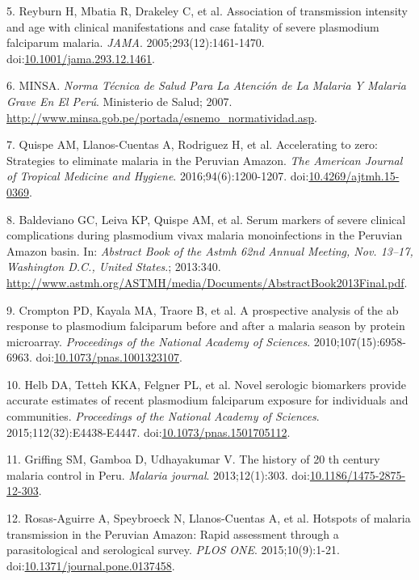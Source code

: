 \documentclass[]{article}
\begin{document}
\hypertarget{ref-reyburn2015}{}
5. Reyburn H, Mbatia R, Drakeley C, et al. Association of transmission
intensity and age with clinical manifestations and case fatality of
severe plasmodium falciparum malaria. \emph{JAMA}.
2005;293(12):1461-1470.
doi:\href{https://doi.org/10.1001/jama.293.12.1461}{10.1001/jama.293.12.1461}.

\hypertarget{ref-norma2001}{}
6. MINSA. \emph{Norma Técnica de Salud Para La Atención de La Malaria Y
Malaria Grave En El Perú}. Ministerio de Salud; 2007.
\url{http://www.minsa.gob.pe/portada/esnemo_normatividad.asp}.

\hypertarget{ref-accelerate2016}{}
7. Quispe AM, Llanos-Cuentas A, Rodriguez H, et al. Accelerating to
zero: Strategies to eliminate malaria in the Peruvian Amazon. \emph{The
American Journal of Tropical Medicine and Hygiene}.
2016;94(6):1200-1207.
doi:\href{https://doi.org/10.4269/ajtmh.15-0369}{10.4269/ajtmh.15-0369}.

\hypertarget{ref-baldevi2013}{}
8. Baldeviano GC, Leiva KP, Quispe AM, et al. Serum markers of severe
clinical complications during plasmodium vivax malaria monoinfections in
the Peruvian Amazon basin. In: \emph{Abstract Book of the Astmh 62nd
Annual Meeting, Nov. 13--17, Washington D.C., United States}.; 2013:340.
\url{http://www.astmh.org/ASTMH/media/Documents/AbstractBook2013Final.pdf}.

\hypertarget{ref-crompton2010}{}
9. Crompton PD, Kayala MA, Traore B, et al. A prospective analysis of
the ab response to plasmodium falciparum before and after a malaria
season by protein microarray. \emph{Proceedings of the National Academy
of Sciences}. 2010;107(15):6958-6963.
doi:\href{https://doi.org/10.1073/pnas.1001323107}{10.1073/pnas.1001323107}.

\hypertarget{ref-Helb2015exposure}{}
10. Helb DA, Tetteh KKA, Felgner PL, et al. Novel serologic biomarkers
provide accurate estimates of recent plasmodium falciparum exposure for
individuals and communities. \emph{Proceedings of the National Academy
of Sciences}. 2015;112(32):E4438-E4447.
doi:\href{https://doi.org/10.1073/pnas.1501705112}{10.1073/pnas.1501705112}.

\hypertarget{ref-griffing2013history}{}
11. Griffing SM, Gamboa D, Udhayakumar V. The history of 20 th century
malaria control in Peru. \emph{Malaria journal}. 2013;12(1):303.
doi:\href{https://doi.org/10.1186/1475-2875-12-303}{10.1186/1475-2875-12-303}.

\hypertarget{ref-hotspots2015}{}
12. Rosas-Aguirre A, Speybroeck N, Llanos-Cuentas A, et al. Hotspots of
malaria transmission in the Peruvian Amazon: Rapid assessment through a
parasitological and serological survey. \emph{PLOS ONE}.
2015;10(9):1-21.
doi:\href{https://doi.org/10.1371/journal.pone.0137458}{10.1371/journal.pone.0137458}.
\end{document}
